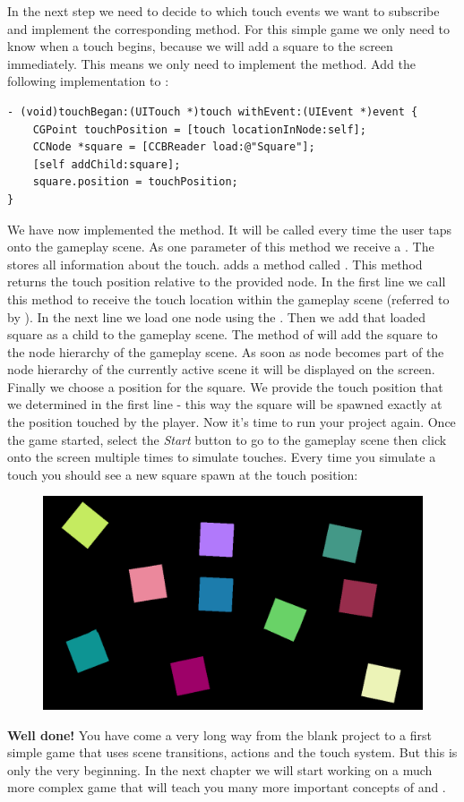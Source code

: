 In the next step we need to decide to which touch events we
want to subscribe and implement the corresponding method. For this simple game
we only need to know when a touch begins, because we will add a square to the
screen immediately. This means we only need to implement the
 method. Add the following implementation to
:
\begin{lstlisting}
- (void)touchBegan:(UITouch *)touch withEvent:(UIEvent *)event {
    CGPoint touchPosition = [touch locationInNode:self];
    CCNode *square = [CCBReader load:@"Square"];
    [self addChild:square];
    square.position = touchPosition;
}
\end{lstlisting}
We have now implemented the  method. It will be called
every time the user taps onto the gameplay scene. As one parameter of this
method we receive a . The  stores all
information about the touch. \cocos{} adds a method called
. This method returns the touch position
relative to the provided node. In the first line we call this method to receive
the touch location within the gameplay scene (referred to by ).
In the next line we load one  node using the
. Then we add that loaded square as a child to the
gameplay scene. The  method of \ccnode{} will add the
square to the node hierarchy of the gameplay scene. As soon as node becomes part
of the node hierarchy of the currently active scene it will be displayed on the
screen. Finally we choose a position for the square.
We provide the touch position that we determined in the first line - this way the square will be spawned exactly at the position touched by
the player. Now it's time to run your project again. Once the game started,
select the \textit{Start} button to go to the gameplay scene then click onto the
screen multiple times to simulate touches. Every time you simulate a touch you
should see a new square spawn at the touch position:
\begin{figure}[H]
		\centering
		\includegraphics[width=350pt]{images/firstproject/spinning_squares.png}
\end{figure}
\textbf{Well done!} You have come a very long way from the blank project to a
first simple game that uses scene transitions, actions and the \cocos{} touch
system. But this is only the very beginning. In the next chapter we will start
working on a much more complex game that will teach you many more important
concepts of \SB{} and \cocos{}. 
